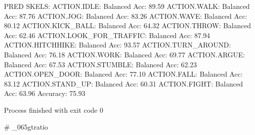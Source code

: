 PRED SKELS:
ACTION.IDLE: Balanced Acc: 89.59%
ACTION.WALK: Balanced Acc: 87.76%
ACTION.JOG: Balanced Acc: 83.26%
ACTION.WAVE: Balanced Acc: 80.12%
ACTION.KICK_BALL: Balanced Acc: 64.32%
ACTION.THROW: Balanced Acc: 62.46%
ACTION.LOOK_FOR_TRAFFIC: Balanced Acc: 87.94%
ACTION.HITCHHIKE: Balanced Acc: 93.57%
ACTION.TURN_AROUND: Balanced Acc: 76.18%
ACTION.WORK: Balanced Acc: 69.77%
ACTION.ARGUE: Balanced Acc: 67.53%
ACTION.STUMBLE: Balanced Acc: 62.23%
ACTION.OPEN_DOOR: Balanced Acc: 77.10%
ACTION.FALL: Balanced Acc: 83.12%
ACTION.STAND_UP: Balanced Acc: 60.31%
ACTION.FIGHT: Balanced Acc: 63.96%
Accuracy: 75.93%

Process finished with exit code 0

# _065gtratio


